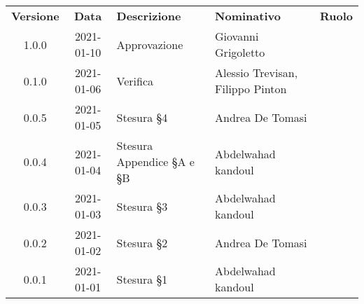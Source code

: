 {
    \renewcommand{\arraystretch}{1.5}
    \centering
    \begin{longtable}{ c c  C{3.5cm}  C{4cm}  c }
        \rowcolor{\primaryColor}
        \textcolor{\secondaryColor}{
        \textbf{Versione}}     & \textcolor{\secondaryColor}{\textbf{Data}}       & \textcolor{\secondaryColor}
        {\textbf{Descrizione}} & \textcolor{\secondaryColor}{\textbf{Nominativo}} & \textcolor{\secondaryColor}{\textbf{Ruolo}}                          \\


        1.0.0                   &2021-01-10                                        & Approvazione                                   &Giovanni Grigoletto & \responsabile{}\\
        0.1.0                  & 2021-01-06                                       & Verifica                            & Alessio Trevisan, Filippo Pinton &\verificatore{}\\
        0.0.5                   &2021-01-05                                        & Stesura §4                              & Andrea De Tomasi & \verificatore{} \\
        0.0.4                  & 2021-01-04                                       & Stesura Appendice §A e §B                          & Abdelwahad kandoul & \verificatore{} \\
        0.0.3                  & 2021-01-03                                       & Stesura §3                            & Abdelwahad kandoul & \verificatore{} \\
        0.0.2                  & 2021-01-02                                       & Stesura §2                              & Andrea De Tomasi & \verificatore{} \\
        0.0.1                  & 2021-01-01                                       & Stesura §1                            & Abdelwahad kandoul & \verificatore{} \\
    
    
    \end{longtable}
}
